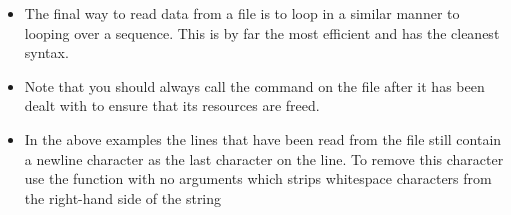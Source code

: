 \documentclass[letterpaper,10pt,english,openany]{sphinxmanual}
\begin{document}
\begin{sphinxVerbatim}[commandchars=\\\{\}]
 
      
       
\end{sphinxVerbatim}
\begin{itemize}
\item {} 
The final way to read data from a file is to loop in a similar manner
to looping over a sequence. This is by far the most efficient and has
the cleanest syntax.

\end{itemize}

\begin{sphinxVerbatim}[commandchars=\\\{\}]
   
\end{sphinxVerbatim}
\begin{itemize}
\item {} 
Note that you should always call the  command on the file
after it has been dealt with to ensure that its resources are freed.

\item {} 
In the above examples the lines that have been read from the file
still contain a newline character as the last character on the line.
To remove this character use the  function with no
arguments which strips whitespace characters from the right-hand side
of the string

\end{itemize}
\end{document}
